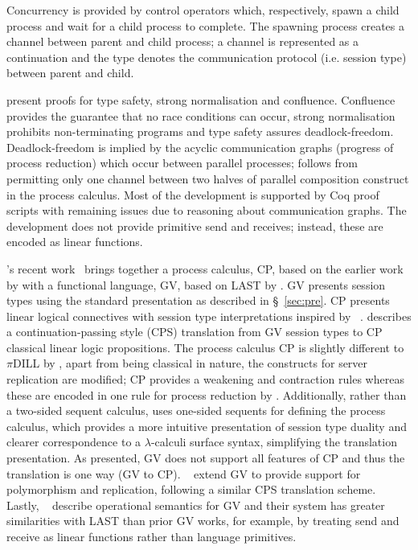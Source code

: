 Concurrency is provided by control operators which, respectively, spawn a
child process and wait for a child process to complete. The spawning process
creates a channel between parent and child process; a channel is represented
as a continuation and the type denotes the communication protocol
(i.e. session type) between parent and child.

\citeauthor{Mazurak:2010:LCC} present proofs for type safety, strong
normalisation and confluence. Confluence provides the guarantee that no race
conditions can occur, strong normalisation prohibits non-terminating programs
and type safety assures deadlock-freedom. Deadlock-freedom is implied by the
acyclic communication graphs (progress of process reduction) which occur
between parallel processes; follows from permitting only one channel between
two halves of parallel composition construct in the process calculus. Most of
the development is supported by Coq proof scripts with remaining issues due to
reasoning about communication graphs. The development does not provide
primitive send and receives; instead, these are encoded as linear functions.

\citeauthor{Wadler:2014}'s recent work~\cite{Wadler:2014} brings together a
process calculus, CP, based on the earlier work by
\citeauthor{Caires:2010:STI} with a functional language, GV, based on LAST by
\citeauthor{Gay:2010:LAST}. GV presents session types using the standard
presentation as described in \S~\ref{sec:pre}. CP presents linear logical
connectives with session type interpretations inspired by
\citeauthor{Caires:2010:STI}~\cite{Caires:2010:STI}. \citeauthor{Wadler:2014}
describes a continuation-passing style (CPS) translation from GV session types
to CP classical linear logic propositions. The process calculus CP is slightly
different to $\pi$DILL by \citeauthor{Caires:2010:STI}, apart from being
classical in nature, the constructs for server replication are modified; CP
provides a weakening and contraction rules whereas these are encoded in one
rule for process reduction by \citeauthor{Caires:2010:STI}. Additionally,
rather than a two-sided sequent calculus, \citeauthor{Wadler:2014} uses
one-sided sequents for defining the process calculus, which provides a more
intuitive presentation of session type duality and clearer correspondence to a
$\lambda$-calculi surface syntax, simplifying the translation presentation. As
presented, GV does not support all features of CP and thus the translation is
one way (GV to CP). \citeauthor{Lindley:2014:SAP}~\cite{Lindley:2014:SAP}
extend GV to provide support for polymorphism and replication, following a
similar CPS translation scheme. Lastly,
\citeauthor{Lindley:2014:SPS}~\cite{Lindley:2014:SPS} describe operational
semantics for GV and their system has greater similarities with LAST than
prior GV works, for example, by treating send and receive as linear functions
rather than language primitives.

